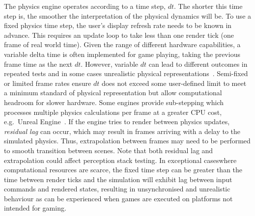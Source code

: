 \documentclass[letterpaper, 10 pt, journal, twoside]{IEEEtran}
\providecommand{\DIFaddtex}[1]{{\protect\color{blue}\uwave{#1}}} %
\providecommand{\DIFaddbegin}{} %
\providecommand{\DIFaddend}{} %
\providecommand{\DIFadd}[1]{\texorpdfstring{\DIFaddtex{#1}}{#1}} %
\begin{document}
The physics engine operates according to a time step, $dt$. %
The shorter this time step is, the smoother the interpretation of the physical dynamics will be. %
%
%
To use a fixed physics time step, the user's display refresh rate needs to be known in advance. This requires an update loop to take less than one render tick (one frame of real world time). Given the range of different hardware capabilities, a variable delta time is often implemented for game playing, taking the previous frame time as the next $dt$. However, variable $dt$ can lead to different outcomes in repeated tests and in some cases unrealistic physical representations~\cite{gaffer}. 
%
Semi-fixed or limited frame rates ensure $dt$ does not exceed some user-defined limit to meet a minimum standard of physical representation but allow computational headroom for slower hardware. Some engines provide sub-stepping which processes multiple physics calculations per frame at a greater CPU cost, e.g.\ Unreal Engine~\cite{UE4_substepping}. 
%
If the engine tries to render between physics updates, \textit{residual lag} can occur, which may result in frames arriving with a delay to the simulated physics.
%
Thus, extrapolation between frames may need to be performed to smooth transition between scenes. 
%
Note that both residual lag and extrapolation could affect perception stack testing.
%
%
In exceptional cases\DIFaddbegin \DIFadd{, }\DIFaddend where computational resources are scarce, the fixed time step can be greater than the time between render ticks %
and the simulation will exhibit lag between input commands and rendered states, resulting in unsynchronised and unrealistic behaviour as can be experienced when games are executed on platforms not intended for gaming. 
\end{document}
